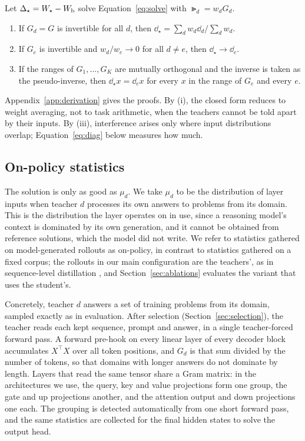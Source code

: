\begin{proposition}
\label{prop:conflict}
Let $\Delta_\star=W_\star-W_{\mathrm{b}}$ solve Equation~\eqref{eq:solve} with
$\Gt_d=w_dG_d$.
\begin{enumerate}
\item[(i)] If $G_d=G$ is invertible for all $d$, then
$\dd_\star=\sum_dw_d\dd_d/\sum_dw_d$.
\item[(ii)] If $G_e$ is invertible and $w_d/w_e\to0$ for all $d\ne e$, then
$\dd_\star\to\dd_e$.
\item[(iii)] If the ranges of $G_1,\dots,G_K$ are mutually orthogonal and the
inverse is taken as the pseudo-inverse, then $\dd_\star x=\dd_ex$ for every
$x$ in the range of $G_e$ and every $e$.
\end{enumerate}
\end{proposition}

Appendix~\ref{app:derivation} gives the proofs. By (i), the closed form reduces
to weight averaging, not to task arithmetic, when the teachers cannot be told
apart by their inputs. By (iii), interference arises only where input
distributions overlap; Equation~\eqref{eq:diag} below measures how much.

\subsection{On-policy statistics}
\label{sec:stats}

The solution is only as good as $\mu_d$. We take $\mu_d$ to be the distribution
of layer inputs when teacher $d$ processes its own answers to problems from
its domain. This is the distribution the layer operates on in use, since a
reasoning model's context is dominated by its own generation, and it cannot be
obtained from reference solutions, which the model did not write. We refer to
statistics gathered on model-generated rollouts as on-policy, in contrast to
statistics gathered on a fixed corpus; the rollouts in our main configuration
are the teachers', as in sequence-level distillation \citep{kim2016sequence},
and Section~\ref{sec:ablations} evaluates the variant that uses the student's.

Concretely, teacher $d$ answers a set of training problems from its domain,
sampled exactly as in evaluation. After selection
(Section~\ref{sec:selection}), the teacher reads each kept sequence, prompt
and answer, in a single teacher-forced forward pass. A forward pre-hook on
every linear layer of every decoder block accumulates $X^{\!\top}X$ over all
token positions, and $G_d$ is that sum divided by the number of tokens, so
that domains with longer answers do not dominate by length. Layers that read
the same tensor share a Gram matrix: in the architectures we use, the query,
key and value projections form one group, the gate and up projections another,
and the attention output and down projections one each. The grouping is
detected automatically from one short forward pass, and the same statistics
are collected for the final hidden states to solve the output head.

